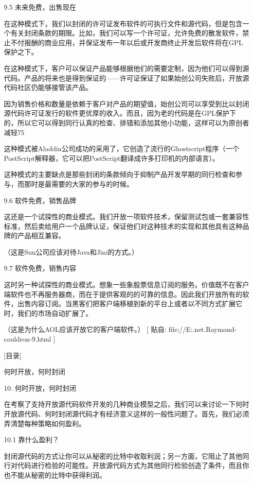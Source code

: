 \documentclass[a4paper,12pt,UTF8,twoside]{ctexbook}
\begin{document}
9.5 未来免费，出售现在


在这种模式下，我们以封闭的许可证发布软件的可执行文件和源代码，但是包含一个有关封闭条款的期限。比如，我们可以写一个许可证，允许免费的散发软件，禁止不付报酬的商业应用，并保证发布一年以后或开发商终止开发后软件将在GPL保护之下。


在这种模式下，客户可以保证产品能够根据他们的需要定制，因为他们可以得到源代码。产品的将来也是得到保证的——许可证保证了如果始创公司失败后，开放源代码社区仍能够接管该产品。


因为销售价格和数量是依赖于客户对产品的期望值，始创公司可以享受到比以封闭源代码许可证发行的软件更优厚的收入。而且，因为老的代码是在GPL保护下的，所以它可以得到同行认真的检查、排错和添加其他小功能，这样可以为原创者减轻75%


这种模式被Aladdin公司成功的采用了，它创造了流行的Ghostscript程序（一个PostScript解释器，它可以把PostScript翻译成许多打印机的内部语言）。


这种模式的主要缺点是那些封闭的条款倾向于抑制产品开发早期的同行检查和参与，而那时是最需要的大家的参与的时候。


9.6 软件免费，销售品牌


这还是一个试探性的商业模式。我们开放一项软件技术，保留测试包或一套兼容性标准，然后卖给用户一个品牌认证，保证他们对这种技术的实现和其他具有这种品牌的产品相互兼容。


（这是Sun公司应该对待Java和Jini的方式。）


9.7 软件免费，销售内容


这时另一种试探性的商业模式。想象一些象股票信息订阅的服务。价值既不在客户端软件也不再服务器商，而在于提供客观的的可靠的信息。因此我们开放所有的软件，出售内容订阅。当黑客们把客户端移植到新的平台上或者以不同方式扩展它时，我们的市场自动扩展了。


（这是为什么AOL应该开放它的客户端软件。）
[ 贴自: file://E:\joyfire\joyfire.net\bible\Eric.Raymond\magic-cauldron-9.html ]

[目录]

何时开放，何时封闭

10. 何时开放，何时封闭

在考察了支持开放源代码软件开发的几种商业模型之后，我们可以来讨论一下何时开放源代码、何时封闭源代码才有经济意义这样的一般性问题了。首先，我们必须弄清楚每种策略如何盈利。


10.1 靠什么盈利？


封闭源代码的方式让你可以从秘密的比特中收取利润；另一方面，它阻止了其他同行对代码进行检验的可能性。开放源代码方式为其他同行检验创造了条件，而且你也不能从秘密的比特中获得利润。
\end{document}
